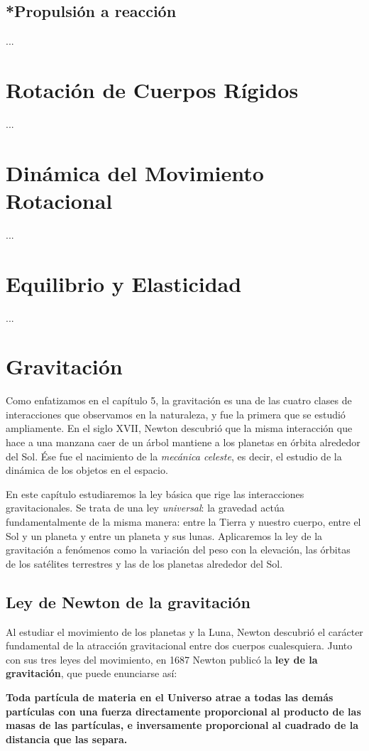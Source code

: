 \documentclass{article}
\newcommand{\newsection}[1]{
    \pagebreak
    {\color{sectionColor}
    \centering
    \section{\bl{#1}}}
    \color{black}
    \vspace{0.5cm}
}
\newcommand{\newsubsection}[1]{
    \vspace{0.5cm}
    \color{sectionColor}
    \subsection{\bl{#1}}
    \color{black}
    \vspace{0.5cm}
}
\newcommand{\bl}[1]{\textbf{#1}}
\newcommand{\definicion}[1]{%
    \vspace{0.5cm}
    \begin{definicionbox}
        #1
    \end{definicionbox}
    \vspace{0.5cm}
}
\begin{document}
    \newsubsection{*Propulsión a reacción}

    \par ...

    \newsection{Rotación de Cuerpos Rígidos}

    \par ...

    \newsection{Dinámica del Movimiento Rotacional}

    \par ...

    \newsection{Equilibrio y Elasticidad}

    \par ...

    \newsection{Gravitación}

    \par Como enfatizamos en el capítulo 5, la gravitación es una de las cuatro clases de interacciones que observamos en la naturaleza, y fue la primera que se estudió ampliamente. En el siglo XVII, Newton descubrió que la misma interacción que hace a una manzana caer de un árbol mantiene a los planetas en órbita alrededor del Sol. Ése fue el nacimiento de la \textit{mecánica celeste}, es decir, el estudio de la dinámica de los objetos en el espacio.

    \par En este capítulo estudiaremos la ley básica que rige las interacciones gravitacionales. Se trata de una ley \textit{universal}: la gravedad actúa fundamentalmente de la misma manera: entre la Tierra y nuestro cuerpo, entre el Sol y un planeta y entre un planeta y sus lunas. Aplicaremos la ley de la gravitación a fenómenos como la variación del peso con la elevación, las órbitas de los satélites terrestres y las de los planetas alrededor del Sol.

    \newsubsection{Ley de Newton de la gravitación}

    \par Al estudiar el movimiento de los planetas y la Luna, Newton descubrió el carácter fundamental de la atracción gravitacional entre dos cuerpos cualesquiera. Junto con sus tres leyes del movimiento, en 1687 Newton publicó la \bl{ley de la gravitación}, que puede enunciarse así:

    \definicion{
        \bl{
            Toda partícula de materia en el Universo atrae a todas las demás partículas con una fuerza directamente proporcional al producto de las masas de las partículas, e inversamente proporcional al cuadrado de la distancia que las separa.
        }
    }
\end{document}
